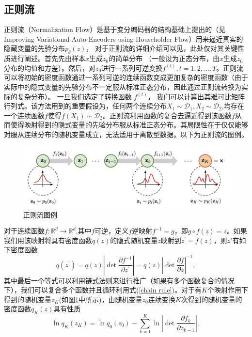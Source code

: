 \subsection{正则流}
正则流（Normalization Flow）是基于变分编码器的结构基础上提出的（见Improving Variational Auto-Encoders
using Householder Flow）用来逼近真实的隐藏变量的先验分布$p_{\theta}(z)$， 对于正则流的详细介绍可以见\cite{Kobyzev_2021}，此处仅对其关键性质进行阐述。首先先由样本$x$生成$z_0$的简单分布
（一般设为正态分布，由$x$生成$z_0$分布的均值和方差）。然后，对$z_0$进行一系列可逆变换$f^{(t)},t=1,2,\dots,T$。正则流可以将初始的密度函数通过一系列可逆的连续函数变成更加复杂的密度函数（由于实际中的隐式变量的先验分布不一定服从标准正态分布，因此通过正则流转换为实际的复杂分布）。 一旦我们选定了转换函数
$f^{(t)}$， 我们可以计算出其雅可比矩阵行列式。该方法用到的重要假设为，任何两个连续分布$X_1\sim \mathcal{D}_1,X_2\sim \mathcal{D}_2$,均存在一个连续函数$f$使得$f(X_1)\sim \mathcal{D_2}$。正则流利用函数的复合去逼近得到该函数$f$从而使得映射得到的隐式变量的先验分布服从标准正态分布。其局限性在于仅仅能够对服从连续分布的随机变量成立，无法适用于离散型数据。以下为正则流的图例。
\begin{figure}[H]
    \centering
    \includegraphics[scale=0.15]{Picture/norm_flow.png}
    \caption{正则流图例}
    \label{Norm_flow}
\end{figure}
对于连续函数$f:\mathbb{R}^{d}\rightarrow \mathbb{R}^d$,其中$f$可逆，定义$f$逆映射$f^{-1}=g$，即$g\circ f(z)=z$。如果我们用该映射将具有密度函数$q(z)$的隐式随机变量$z$映射到$z^{\prime}=f(z)$，则$z'$有如下密度函数
\begin{equation}
    q(z^{\prime}) = q(z)|\operatorname{det}\frac{\partial f^{-1}}{\partial z^{\prime}}|= q(z)|\operatorname{det}\frac{\partial f}{\partial z}|^{-1},
    \label{chain rule}
\end{equation}
其中最后一个等式可以利用链式法则来进行推广（如果有多个函数复合的情况下），我们可以复合多个函数并且循环利用式(\ref{chain rule})。对于有$K$个映射作用下得到的随机变量$z_{K}$(如图\ref{Norm_flow}中所示)，由随机变量$z_0$连续变换$K$次得到的随机变量的密度函数$q_{K}(z)$具有性质
\begin{equation}
    \ln q_{K}(z_{K}) = \ln q_{0}(z_0)-\sum_{k=1}^{K}\ln |\operatorname{det}\frac{\partial f_k}{\partial z_{k-1}}|,
    \label{chain log likelihood}
\end{equation}
